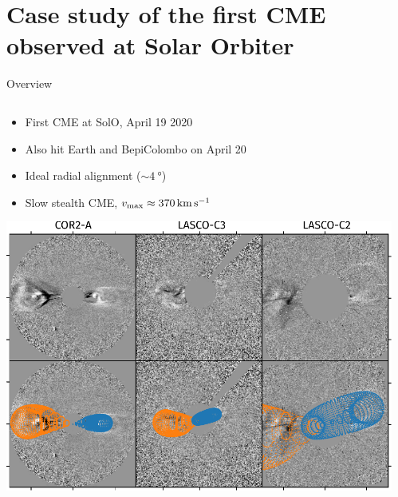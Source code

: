 \documentclass[10pt,aspectratio=169,usenames,dvipsnames]{beamer}
\newcommand{\maxt}{\ensuremath\text{max}}
\begin{document}
\section{Case study of the first CME observed at Solar Orbiter}

\begin{frame}{Overview}
    \begin{columns}
        \begin{column}{0.4\textwidth}
            \begin{itemize}
                \item First CME at SolO, April 19 2020
                \item Also hit Earth and BepiColombo on April 20
                \item Ideal radial alignment ($\sim\SI{4}{\degree}$)
                \item Slow stealth CME, $v_\maxt \approx \SI{370}{\kilo\meter\per\second}$
            \end{itemize}
            \vspace{2mm}
            \includegraphics[width=\textwidth]{plots/gcs_reconstruction.pdf}
        \end{column}
        \begin{column}{0.5\textwidth}
        	\vskip2mm

\end{column}
\end{columns}
\end{frame}
\end{document}
